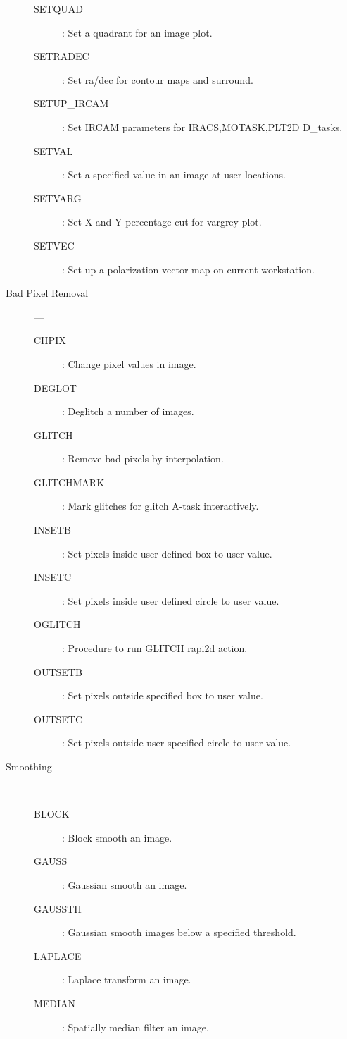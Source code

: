 \begin{description}
\begin{description}
\item [SETQUAD] : Set a quadrant for an image plot.
\item [SETRADEC] : Set ra/dec for contour maps and surround.
\item [SETUP\_IRCAM] : Set IRCAM parameters for IRACS,MOTASK,PLT2D D\_tasks.
\item [SETVAL] : Set a specified value in an image at user locations.
\item [SETVARG] : Set X and Y percentage cut for vargrey plot.
\item [SETVEC] : Set up a polarization vector map on current workstation.
\end{description}

\item [Bad Pixel Removal] ---
\begin{description}
\item [CHPIX] : Change pixel values in image.
\item [DEGLOT] : Deglitch a number of images.
\item [GLITCH] : Remove bad pixels by interpolation.
\item [GLITCHMARK] : Mark glitches for glitch A-task interactively.
\item [INSETB] : Set pixels inside user defined box to user value.
\item [INSETC] : Set pixels inside user defined circle to user value.
\item [OGLITCH] : Procedure to run GLITCH rapi2d action.
\item [OUTSETB] : Set pixels outside specified box to user value.
\item [OUTSETC] : Set pixels outside user specified circle to user value.
\end{description}

\item [Smoothing] ---
\begin{description}
\item [BLOCK] : Block smooth an image.
\item [GAUSS] : Gaussian smooth an image.
\item [GAUSSTH] : Gaussian smooth images below a specified threshold.
\item [LAPLACE] : Laplace transform an image.
\item [MEDIAN] : Spatially median filter an image.
\end{description}


\end{description}

